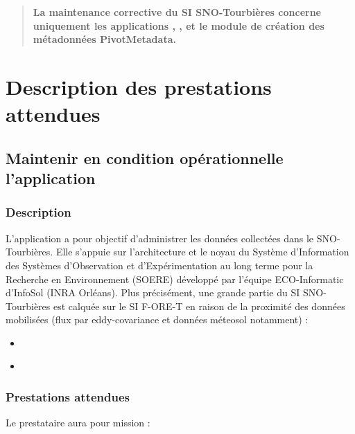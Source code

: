 \documentclass[]{article}
\newcommand{\mhref}[3][blue]{\href{#2}{\color{#1}{#3}}}%
\newcommand{\SNOT}{{SNO-Tourbières}}
\newcommand{\datasnot}{{\mhref{https://data-snot.cnrs.fr/}{data-snot}}}
\newcommand{\dataaccess}{{\mhref{https://data-snot.cnrs.fr/data-access/}{data-access}}}
\newcommand{\dataarchive}{{\mhref{https://data-snot.cnrs.fr/dataset-archive/}{dataset-archive}}}
\begin{document}
\begin{quotation}
\textbf{La maintenance corrective du SI \SNOT{} concerne uniquement les applications \datasnot, \dataaccess, \dataarchive{} et le module de création des métadonnées \og{}PivotMetadata\fg{}.}
\end{quotation}

\section{Description des prestations attendues}

\subsection{Maintenir en condition opérationnelle l'application \datasnot}

\subsubsection{Description}

L'application \datasnot{} a pour objectif d'administrer les données collectées dans le \SNOT{}. Elle s'appuie sur l'architecture et le noyau du Système d'Information des Systèmes d'Observation et d'Expérimentation au long terme pour la Recherche en Environnement (SOERE) développé par l'équipe ECO-Informatic d'InfoSol (INRA Orléans). Plus précisément, une grande partie du SI \SNOT{} est calquée sur le SI F-ORE-T en raison de la proximité des données mobilisées (flux par eddy-covariance et données méteosol notamment) :

\begin{itemize}
\item \mhref{https://git.renater.fr/authscm/jbparoisien/gitweb/?p=si-soere-kernel/documentations.git;a=blob_plain;f=techniques/Architecture_si_ecoinformatique_soere.pdf;hb=HEAD}{Architecture fonctionnelle du SI des SOERE}
\item \mhref{https://git.renater.fr/authscm/jbparoisien/gitweb/?p=si-soere-kernel/documentations.git;a=blob_plain;f=techniques/guide_du_d\%c3\%a9veloppeur/guideDeveloppeurNoyau1709.odt;hb=HEAD}{Guide de développement}
\end{itemize}

\subsubsection{Prestations attendues}

Le prestataire aura pour mission :
\end{document}

